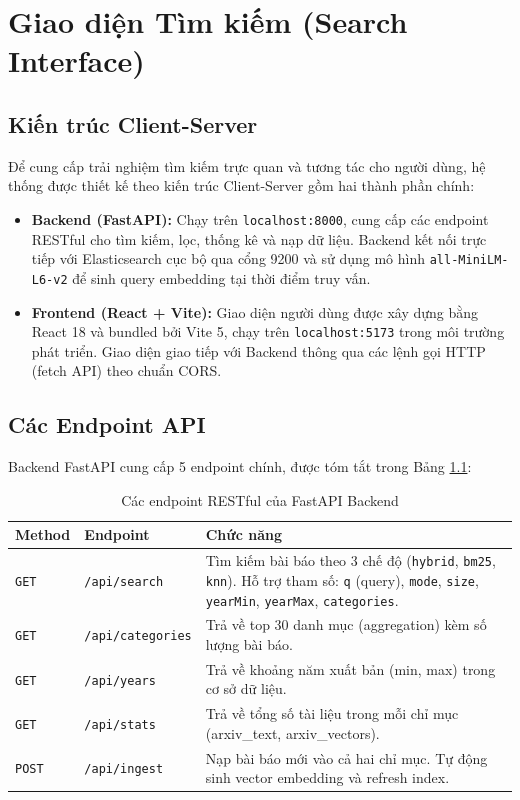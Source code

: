 \chapter{Giao diện Tìm kiếm (Search Interface)}
\label{ch:ui}

\section{Kiến trúc Client-Server}
Để cung cấp trải nghiệm tìm kiếm trực quan và tương tác cho người dùng, hệ thống được thiết kế theo kiến trúc Client-Server gồm hai thành phần chính:

\begin{itemize}
    \item \textbf{Backend (FastAPI):} Chạy trên \texttt{localhost:8000}, cung cấp các endpoint RESTful cho tìm kiếm, lọc, thống kê và nạp dữ liệu. Backend kết nối trực tiếp với Elasticsearch cục bộ qua cổng 9200 và sử dụng mô hình \texttt{all-MiniLM-L6-v2} để sinh query embedding tại thời điểm truy vấn.
    \item \textbf{Frontend (React + Vite):} Giao diện người dùng được xây dựng bằng React 18 và bundled bởi Vite 5, chạy trên \texttt{localhost:5173} trong môi trường phát triển. Giao diện giao tiếp với Backend thông qua các lệnh gọi HTTP (fetch API) theo chuẩn CORS.
\end{itemize}

\section{Các Endpoint API}
Backend FastAPI cung cấp 5 endpoint chính, được tóm tắt trong Bảng \ref{tab:api-endpoints}:

\begin{table}[H]
\centering
\begin{tabular}{|l|l|p{8cm}|}
\hline
\textbf{Method} & \textbf{Endpoint} & \textbf{Chức năng} \\
\hline
\texttt{GET} & \texttt{/api/search} & Tìm kiếm bài báo theo 3 chế độ (\texttt{hybrid}, \texttt{bm25}, \texttt{knn}). Hỗ trợ tham số: \texttt{q} (query), \texttt{mode}, \texttt{size}, \texttt{yearMin}, \texttt{yearMax}, \texttt{categories}. \\
\hline
\texttt{GET} & \texttt{/api/categories} & Trả về top 30 danh mục (aggregation) kèm số lượng bài báo. \\
\hline
\texttt{GET} & \texttt{/api/years} & Trả về khoảng năm xuất bản (min, max) trong cơ sở dữ liệu. \\
\hline
\texttt{GET} & \texttt{/api/stats} & Trả về tổng số tài liệu trong mỗi chỉ mục (arxiv\_text, arxiv\_vectors). \\
\hline
\texttt{POST} & \texttt{/api/ingest} & Nạp bài báo mới vào cả hai chỉ mục. Tự động sinh vector embedding và refresh index. \\
\hline
\end{tabular}
\caption{Các endpoint RESTful của FastAPI Backend}
\label{tab:api-endpoints}
\end{table}

